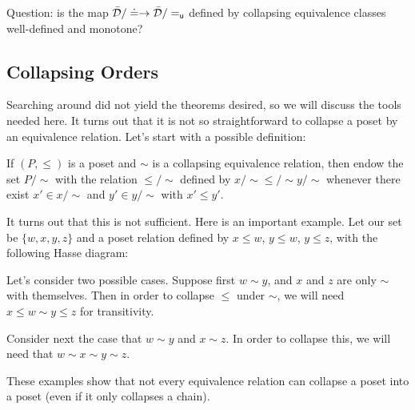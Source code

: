 \documentclass[11pt]{article}
\begin{document}
Question: is the map $\bar{\mathcal{D}} / \doteq \to \bar{\mathcal{D}} / =_{\mathsf{u}}$ defined by collapsing equivalence classes well-defined and monotone? 


\subsection{Collapsing Orders}

Searching around did not yield the theorems desired, so we will discuss the tools needed here. It turns out that it is not so straightforward to collapse a poset by an equivalence relation. Let's start with a possible definition: 

If $(P,\leq)$ is a poset and $\sim$ is a collapsing equivalence relation, then endow the set $P/\sim$ with the relation $\leq/\sim$ defined by $x/\sim \leq/\sim y/\sim$ whenever there exist $x'\in x/\sim$ and $y'\in y/\sim$ with $x'\leq y'$. 

It turns out that this is not sufficient. Here is an important example. Let our set be $\{w,x,y,z\}$ and a poset relation defined by $x\leq w$, $y\leq w$, $y\leq z$, with the following Hasse diagram:


Let's consider two possible cases. Suppose first $w\sim y$, and $x$ and $z$ are only $\sim$ with themselves. Then in order to collapse $\leq$ under $\sim$, we will need $x \leq w\sim y \leq z$ for transitivity. 

Consider next the case that $w\sim y$ and $x\sim z$. In order to collapse this, we will need that $w\sim x\sim y \sim z$.

These examples show that not every equivalence relation can collapse a poset into a poset (even if it only collapses a chain). 
\end{document}
